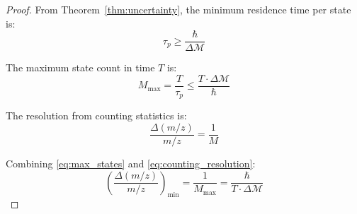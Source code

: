 \documentclass[twocolumn,10pt,a4paper]{article}
\theoremstyle{definition}
\theoremstyle{remark}
\newcommand{\Mdepth}{\mathcal{M}}
\newcommand{\taup}{\tau_p}
\begin{document}
\begin{proof}
From Theorem~\ref{thm:uncertainty}, the minimum residence time per state is:
\begin{equation}
    \taup \geq \frac{\hbar}{\Delta\Mdepth}
\end{equation}

The maximum state count in time $T$ is:
\begin{equation}
    M_{\max} = \frac{T}{\taup} \leq \frac{T \cdot \Delta\Mdepth}{\hbar}
    \label{eq:max_states}
\end{equation}

The resolution from counting statistics is:
\begin{equation}
    \frac{\Delta(m/z)}{m/z} = \frac{1}{M}
    \label{eq:counting_resolution}
\end{equation}

Combining \eqref{eq:max_states} and \eqref{eq:counting_resolution}:
\begin{equation}
    \left(\frac{\Delta(m/z)}{m/z}\right)_{\min} = \frac{1}{M_{\max}} = \frac{\hbar}{T \cdot \Delta\Mdepth}
\end{equation}
\end{proof}
\end{document}
